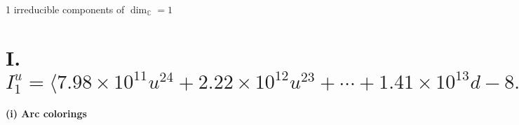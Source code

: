 \documentclass[1p]{elsarticle_modified}
\theoremstyle{definition}
\begin{document}
\raggedright * 1 irreducible components of $\dim_{\mathbb{C}}=1$ \\
\newpage
\renewcommand{\arraystretch}{1}
\centering \section*{I. $I^u_{1}= \langle 7.98\times10^{11} u^{24}+2.22\times10^{12} u^{23}+\cdots+1.41\times10^{13} d-8.84\times10^{12},\;-3.65\times10^{11} u^{24}+1.12\times10^{12} u^{23}+\cdots+2.82\times10^{13} c-4.46\times10^{13},\;4.59\times10^{11} u^{24}+3.67\times10^{11} u^{23}+\cdots+7.06\times10^{12} b-1.24\times10^{12},\;-1.69\times10^{12} u^{24}-1.80\times10^{12} u^{23}+\cdots+2.82\times10^{13} a-3.06\times10^{13},\;u^{25}+2 u^{24}+\cdots-16 u-8 \rangle$}
\flushleft \textbf{(i) Arc colorings}\\
\end{document}
